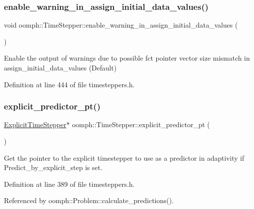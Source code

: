 \subsubsection{\texorpdfstring{enable\+\_\+warning\+\_\+in\+\_\+assign\+\_\+initial\+\_\+data\+\_\+values()}{enable\_warning\_in\_assign\_initial\_data\_values()}}
{\footnotesize\ttfamily void oomph\+::\+Time\+Stepper\+::enable\+\_\+warning\+\_\+in\+\_\+assign\+\_\+initial\+\_\+data\+\_\+values (\begin{DoxyParamCaption}{ }\end{DoxyParamCaption})\hspace{0.3cm}{\ttfamily [inline]}}



Enable the output of warnings due to possible fct pointer vector size mismatch in assign\+\_\+initial\+\_\+data\+\_\+values (Default) 



Definition at line 444 of file timesteppers.\+h.

\mbox{\label{classoomph_1_1TimeStepper_ab570dfd6a22d73079599a97d462de9ef}} 
\subsubsection{\texorpdfstring{explicit\+\_\+predictor\+\_\+pt()}{explicit\_predictor\_pt()}}
{\footnotesize\ttfamily \hyperlink{classoomph_1_1ExplicitTimeStepper}{Explicit\+Time\+Stepper}$\ast$ oomph\+::\+Time\+Stepper\+::explicit\+\_\+predictor\+\_\+pt (\begin{DoxyParamCaption}{ }\end{DoxyParamCaption})\hspace{0.3cm}{\ttfamily [inline]}}

Get the pointer to the explicit timestepper to use as a predictor in adaptivity if Predict\+\_\+by\+\_\+explicit\+\_\+step is set. 

Definition at line 389 of file timesteppers.\+h.



Referenced by oomph\+::\+Problem\+::calculate\+\_\+predictions().

\mbox{\label{classoomph_1_1TimeStepper_aa02483da1254fab8f268d70bb3ef2289}} 
